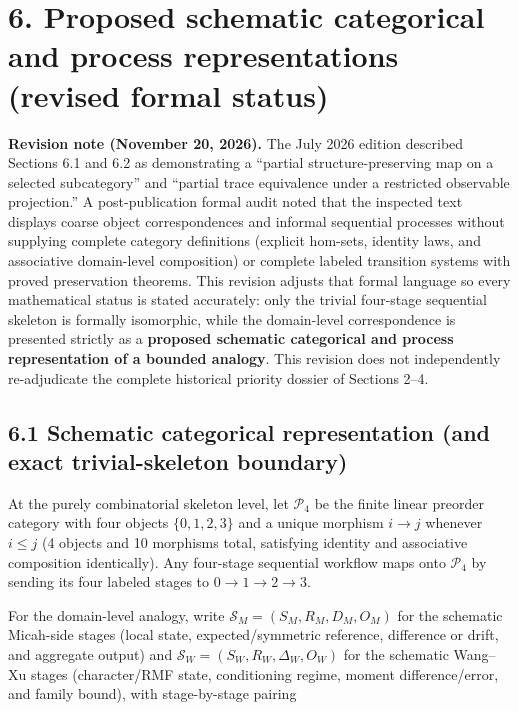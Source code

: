 \documentclass[
  american,
  11pt,
  letterpaper,
]{article}
\begin{document}
\section{6. Proposed schematic categorical and process representations (revised formal status)}\label{proposed-schematic-categorical-and-process-representations-revised-formal-status}

\textbf{Revision note (November 20, 2026).} The July 2026 edition described Sections 6.1 and 6.2 as demonstrating a ``partial structure-preserving map on a selected subcategory'' and ``partial trace equivalence under a restricted observable projection.'' A post-publication formal audit noted that the inspected text displays coarse object correspondences and informal sequential processes without supplying complete category definitions (explicit hom-sets, identity laws, and associative domain-level composition) or complete labeled transition systems with proved preservation theorems. This revision adjusts that formal language so every mathematical status is stated accurately: only the trivial four-stage sequential skeleton is formally isomorphic, while the domain-level correspondence is presented strictly as a \textbf{proposed schematic categorical and process representation of a bounded analogy}. This revision does not independently re-adjudicate the complete historical priority dossier of Sections 2--4.

\subsection{6.1 Schematic categorical representation (and exact trivial-skeleton boundary)}\label{schematic-categorical-representation-and-exact-trivial-skeleton-boundary}

At the purely combinatorial skeleton level, let \(\mathcal{P}_4\) be the finite linear preorder category with four objects \(\{0, 1, 2, 3\}\) and a unique morphism \(i \to j\) whenever \(i \le j\) (4 objects and 10 morphisms total, satisfying identity and associative composition identically). Any four-stage sequential workflow maps onto \(\mathcal{P}_4\) by sending its four labeled stages to \(0 \to 1 \to 2 \to 3\).

For the domain-level analogy, write \(\mathcal{S}_M = (S_M, R_M, D_M, O_M)\) for the schematic Micah-side stages (local state, expected/symmetric reference, difference or drift, and aggregate output) and \(\mathcal{S}_W = (S_W, R_W, \Delta_W, O_W)\) for the schematic Wang--Xu stages (character/RMF state, conditioning regime, moment difference/error, and family bound), with stage-by-stage pairing
\end{document}
